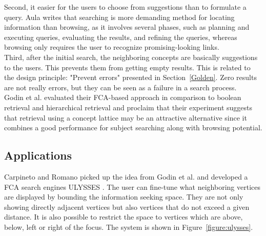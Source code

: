 \documentclass[11pt]{report}
\begin{document}
Second, it easier for the users to choose from suggestions than to formulate a query. Aula \cite{Aula2005} writes that searching is more demanding method for locating information than browsing, as it involves several phases, such as planning and executing queries, evaluating the results, and refining the queries, whereas browsing only requires the user to recognize promising-looking links. \\

Third, after the initial search, the neighboring concepts are basically suggestions to the users. This prevents them from getting empty results. This is related to the design principle: "Prevent errors" presented in Section~\ref{Golden}. Zero results are not really errors, but they can be seen as a failure in a search process.\\

Godin et al. \cite{Godin1993} evaluated their FCA-based approach in comparison to boolean retrieval and hierarchical retrieval and proclaim that their experiment suggests that retrieval using a concept lattice may be an attractive alternative since it combines a good performance for subject searching along with browsing potential.

\subsection{Applications}
Carpineto and Romano picked up the idea from Godin et al. and developed a FCA search engines ULYSSES \cite{Carpineto1995,Carpineto1996}. The user can fine-tune what neighboring vertices are displayed by bounding the information seeking space. They are not only showing directly adjacent vertices but also vertices that do not exceed a given distance. It is also possible to restrict the space to vertices which are above, below, left or right of the focus. The system is shown in Figure~\ref{figure:ulysses}. \\
\end{document}
